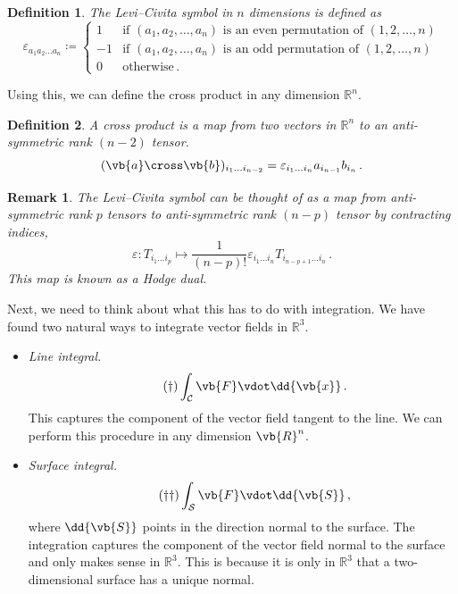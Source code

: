 \documentclass{article}
\theoremstyle{plain}\theoremheaderfont{\normalfont\itshape}\theorembodyfont{\rmfamily}\theoremseparator{.}\newtheorem*{rem}{Remark}\newtheorem*{ex}{Example}\newtheorem*{proof}{Proof}\newtheorem*{altp}{Alternative proof}
\theoremstyle{plain}\theoremheaderfont{\normalfont\bfseries}\theorembodyfont{\rmfamily}\theoremseparator{.}\newtheorem{thm}{Theorem}[section]\newtheorem{lem}[thm]{Lemma}\newtheorem{prop}[thm]{Proposition}\newtheorem*{cor}{Corollary}\newtheorem{defn}[thm]{Definition}\newtheorem{clm}[thm]{Claim}\newtheorem{clminproof}{Claim}
\theoremstyle{break}\theoremheaderfont{\normalfont\itshape}\theorembodyfont{\rmfamily}\theoremseparator{.\medskip}\newtheorem*{proofskip}{Proof}\newtheorem*{exs}{Examples}\newtheorem*{rems}{Remarks}
\theoremstyle{break}\theoremheaderfont{\normalfont\bfseries}\theorembodyfont{\rmfamily}\theoremseparator{.\medskip}\newtheorem{lemskip}[thm]{Lemma}\newtheorem{defnskip}[thm]{Definition}\newtheorem{propskip}[thm]{Proposition}\newtheorem{thmskip}[thm]{Theorem}
\numberwithin{equation}{section}
\begin{document}
	\begin{defn}
		The \textit{Levi--Civita symbol} in \(n\) dimensions is defined as
		\[\varepsilon_{a_1a_2\dots a_n}\coloneqq\begin{cases}
			1 & \text{if }(a_1,a_2,\dots,a_n)\text{ is an even permutation of }(1,2,\dots,n)\\
			-1 & \text{if }(a_1,a_2,\dots,a_n)\text{ is an odd permutation of }(1,2,\dots,n)\\
			0 & \text{otherwise}\,.
		\end{cases}\]
	\end{defn}
	Using this, we can define the cross product in any dimension \(\mathbb{R}^n\).
	\begin{defn}
		A \textit{cross product} is a map from two vectors in \(\mathbb{R}^n\) to an anti-symmetric rank \((n-2)\) tensor.
		\[(\vb{a}\cross\vb{b})_{i_1\dots i_{n-2}}=\varepsilon_{i_1\dots i_n}a_{i_{n-1}}b_{i_n}\,.\]
	\end{defn}
	\begin{rem}
		The Levi--Civita symbol can be thought of as a map from anti-symmetric rank \(p\) tensors to anti-symmetric rank \((n-p)\) tensor by contracting indices,
		\[\varepsilon:T_{i_1\dots i_p}\mapsto\frac{1}{(n-p)!}\varepsilon_{i_1\dots i_n}T_{i_{n-p+1}\dots i_n}\,.\]
		This map is known as a \textit{Hodge dual}.
	\end{rem}

	Next, we need to think about what this has to do with integration. We have found two natural ways to integrate vector fields in \(\mathbb{R}^3\).
	
	\begin{itemize}
		\item \textit{Line integral.}
		\begin{equation}\tag{\(\dagger\)}
			\int_{\mathcal{C}}\vb{F}\vdot\dd{\vb{x}}\,.
		\end{equation}
		This captures the component of the vector field tangent to the line. We can perform this procedure in any dimension \(\vb{R}^n\).
		\item \textit{Surface integral.}
		\begin{equation}\tag{\(\dagger\dagger\)}
			\int_{\mathcal{S}}\vb{F}\vdot\dd{\vb{S}}\,,
		\end{equation}
		where \(\dd{\vb{S}}\) points in the direction normal to the surface. The integration captures the component of the vector field normal to the surface and only makes sense in \(\mathbb{R}^3\). This is because it is only in \(\mathbb{R}^3\) that a two-dimensional surface has a unique normal.
	\end{itemize}
\end{document}
